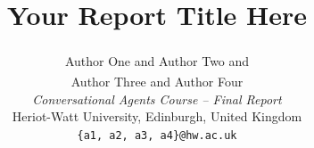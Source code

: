 \documentclass[11pt]{article}
\title{\Large\textbf{Your Report Title Here}}
\author{
  Author One\textsuperscript{} and Author Two\textsuperscript{} and \\
  Author Three\textsuperscript{} and Author Four\textsuperscript{} \\[6pt]
  \textit{Conversational Agents Course -- Final Report} \\
  Heriot-Watt University, Edinburgh, United Kingdom \\
  \texttt{\{a1, a2, a3, a4\}@hw.ac.uk}
}
\date{}
\newif\ifguidance
\newcommand{\guidance}[1]{\ifguidance\textcolor{blue}{\small\textit{[#1]}}\fi}
\begin{document}
\maketitle


\begin{abstract}
\noindent
\guidance{%
  MARKING: This section contributes to the ``Abstract, Aims, Objectives and
  Project Description'' criterion (10 marks). The abstract must succinctly
  describe the project. Cover: (1) the problem/task addressed, (2) your
  approach and key components, (3) evaluation methods used, and (4) main
  findings. Keep to 100--200 words. The marker will check that research
  aims are immediately apparent from reading this.}


\end{abstract}
\end{document}
